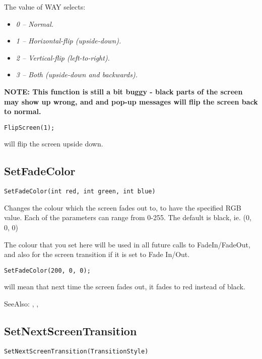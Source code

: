 The value of WAY selects:
\begin{itemize}
\item \it{0} -- Normal.
\item \it{1} -- Horizontal-flip (upside-down).
\item \it{2} -- Vertical-flip  (left-to-right).
\item \it{3} -- Both (upside-down and backwards).
\end{itemize}
\bf{NOTE}: This function is still a bit buggy - black parts of the screen may
show up wrong, and and pop-up messages will flip the screen back to normal.

\begin{verbatim}
FlipScreen(1);
\end{verbatim}
will flip the screen upside down.


\subsection{SetFadeColor}\label{SetFadeColor}%

\begin{verbatim}
SetFadeColor(int red, int green, int blue)
\end{verbatim}

Changes the colour which the screen fades out to, to have the specified RGB value. Each of the
parameters can range from 0-255. The default is black, ie. (0, 0, 0)

The colour that you set here will be used in all future calls to FadeIn/FadeOut, and also
for the screen transition if it is set to Fade In/Out.

\begin{verbatim}
SetFadeColor(200, 0, 0);
\end{verbatim}
will mean that next time the screen fades out, it fades to red instead of black.

SeeAlso: , ,


\subsection{SetNextScreenTransition}\label{SetNextScreenTransition}%

\begin{verbatim}
SetNextScreenTransition(TransitionStyle)
\end{verbatim}

